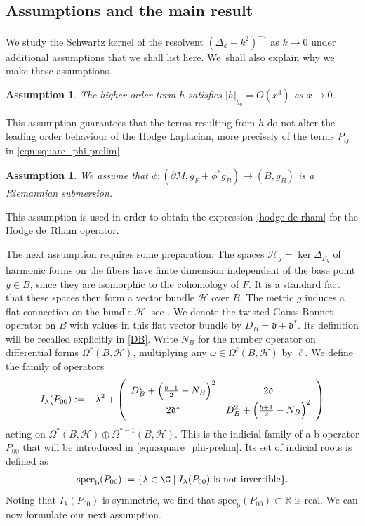 \documentclass[JEP,XML,SOM,Unicode,NoFloatCountersInSection,published]{cedram}
\theoremstyle{plain}
\newtheorem{assum}[Th]{Assumption}
\theoremstyle{definition}
\newcommand{\R}{{\mathbb{R}}}
\newcommand{\bb}{{\mathrm{b}}}
\newcommand{\specb}{\mathrm{spec}_\bb}
\let\w\omega
\begin{document}
\subsection{Assumptions and the main result}

We study the Schwartz kernel of the resol\-vent $(\Delta_{\phi} + k^{2})^{-1}$ as $k\to 0$ under
additional assumptions that we shall list here. We~shall also explain why we make these assumptions.

\begin{assum}\label{assum1}
The higher order term $h$ satisfies $\vert h \vert_{g_{0}} = O(x^3)$ as $x \to 0$.
\end{assum}

This assumption
guarantees that the terms resulting from $h$ do not alter the leading order behaviour of the Hodge Laplacian, more precisely of the terms $P_{ij}$ in \eqref{eqn:square_phi-prelim}.

\begin{assum}\label{assum2}
We assume that $\phi: (\partial M, g_F + \phi^*g_B)
\to (B, g_B)$ is a Riemannian submersion.
\end{assum}

This assumption is used in order to obtain the expression
\eqref{hodge de rham} for the Hodge de~Rham operator.

The next assumption requires some preparation:
The spaces $\mathscr{H}_y=\ker \Delta_{F_y}$ of harmonic forms on the fibers have
finite dimension independent of the base point $y \in B$, since they are isomorphic
to the cohomology of $F$. It is a standard fact that these spaces then form a vector bundle $\mathscr{H}$
over $B$. The metric $g$ induces a flat connection on the bundle $\mathscr{H}$, see
\cite[Prop.\,15]{gravi-ins}. We denote the twisted Gauss-Bonnet operator on $B$
with values in this flat vector bundle by $D_B = \mathfrak{d} + \mathfrak{d}^*$.
Its definition will be recalled explicitly in
\eqref{DB}. Write $N_B$ for the number operator on differential forms $\Omega^*(B,\mathscr{H})$,
multiplying any $\w \in \Omega^\ell(B,\mathscr{H})$ by $\ell$. We define the family of operators
\begin{align}\label{Indicial family}
I_\lambda(P_{00}) := -\lambda^2 + \left(\begin{array}{cc}
D^2_{B} + \Bigl(\frac{b-1}2-N_B\Bigr)^{2} &2\mathfrak{d} \\
2\mathfrak{d}^* & D^2_B + \Bigl(\frac{b+1}2-N_B\Bigr)^{2}
\end{array} \right)
\end{align}
acting on $\Omega^*(B,\mathscr{H})\oplus \Omega^{*-1}(B,\mathscr{H})$.
This is the indicial family of a b-operator $P_{00}$ that will be introduced
in \eqref{eqn:square_phi-prelim}. Its set of indicial roots is defined as
\begin{align}\label{Indicial set}
\specb(P_{00}) := \{ \lambda \in \C \mid
I_\lambda(P_{00}) \ \text{is not invertible} \}.
\end{align}
Noting that $I_\lambda(P_{00})$ is symmetric, we find that
$\specb(P_{00}) \subset \R$ is real. We can now formulate our next
assumption.
\end{document}
